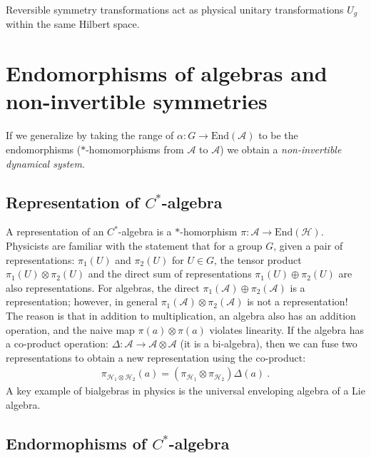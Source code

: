 \documentclass{article}
\newcommand{\mA}{\mathcal{A}}
\theoremstyle{definition}
\begin{document}
  Reversible symmetry transformations act as physical unitary transformations $U_{g}$
  within the same Hilbert space.

  \section{Endomorphisms of algebras and non-invertible symmetries}

  If we generalize by taking the range of $\alpha:G\to \text{End}(\mA)$ to be
  the endomorphisms ($*$-homomorphisms from $\mA$ to $\mA$) we obtain a
  {\it non-invertible dynamical system}.

  \subsection*{Representation of $C^{*}$-algebra}

  A representation of an $C^{*}$-algebra is a $*$-homorphism $\pi:\mathcal{A}\to
  \mathrm{End}(\mathcal{H})$. Physicists are familiar with the statement that
  for a group $G$, given a pair of representations: $\pi_{1}(U)$ and
  $\pi_{2}(U)$ for $U\in G$, the tensor product $\pi_{1}(U)\otimes \pi_{2}(U)$ and
  the direct sum of representations $\pi_{1}(U)\oplus \pi_{2}(U)$ are also representations.
  For algebras, the direct $\pi_{1}(\mathcal{A})\oplus \pi_{2}(\mathcal{A})$ is a
  representation; however, in general $\pi_{1}(\mathcal{A}) \otimes \pi_{2}(\mathcal{A}
  )$ is not a representation! The reason is that in addition to multiplication, an
  algebra also has an addition operation, and the naive map
  $\pi(a)\otimes \pi(a)$ violates linearity. If the algebra has a co-product operation:
  $\Delta:\mathcal{A}\to \mathcal{A}\otimes \mathcal{A}$ (it is a bi-algebra), then
  we can fuse two representations to obtain a new representation using the co-product:
  \begin{eqnarray}
    \pi_{\mathcal{H}_1\otimes \mathcal{H}_2}(a)=(\pi_{\mathcal{H}_1}\otimes \pi_{\mathcal{H}_2})\Delta(a)\ .
  \end{eqnarray}
  A key example of bialgebras in physics is the universal enveloping algebra of
  a Lie algebra.

  \subsection*{Endormophisms of $C^{*}$-algebra}
\end{document}
